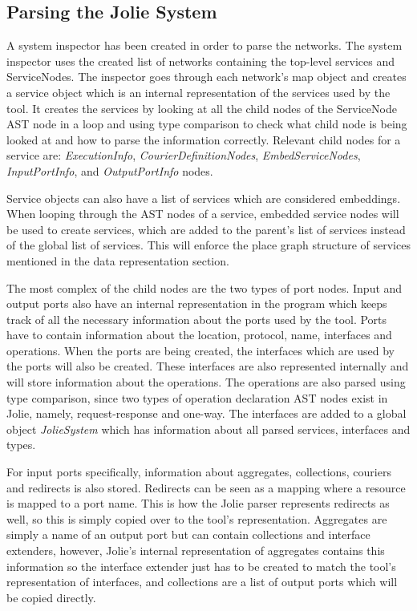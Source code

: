 \subsection{Parsing the Jolie System}
A system inspector has been created in order to parse the networks.
The system inspector uses the created list of networks containing the top-level services and ServiceNodes.
The inspector goes through each network's map object and creates a service object which is an internal representation of the services used by the tool.
It creates the services by looking at all the child nodes of the ServiceNode AST node in a loop and using type comparison to check what child node is being looked at and how to parse the information correctly.
Relevant child nodes for a service are: \textit{ExecutionInfo}, \textit{CourierDefinitionNodes}, \textit{EmbedServiceNodes}, \textit{InputPortInfo}, and \textit{OutputPortInfo} nodes.

Service objects can also have a list of services which are considered embeddings. When looping through the AST nodes of a service, embedded service nodes will be used to create services, which are added to the parent's list of services instead of the global list of services.
This will enforce the place graph structure of services mentioned in the data representation section.

The most complex of the child nodes are the two types of port nodes. Input and output ports also have an internal representation in the \javatoolname[] program which keeps track of all the necessary information about the ports used by the tool.
Ports have to contain information about the location, protocol, name, interfaces and operations.
When the ports are being created, the interfaces which are used by the ports will also be created. These interfaces are also represented internally and will store information about the operations.
The operations are also parsed using type comparison, since two types of operation declaration AST nodes exist in Jolie, namely, request-response and one-way.
The interfaces are added to a global object \textit{JolieSystem} which has information about all parsed services, interfaces and types.

For input ports specifically, information about aggregates, collections, couriers and redirects is also stored. Redirects can be seen as a mapping where a resource is mapped to a port name. This is how the Jolie parser represents redirects as well, so this is simply copied over to the tool's representation.
Aggregates are simply a name of an output port but can contain collections and interface extenders, however, Jolie's internal representation of aggregates contains this information so the interface extender just has to be created to match the tool's representation of interfaces, and collections are a list of output ports which will be copied directly.

